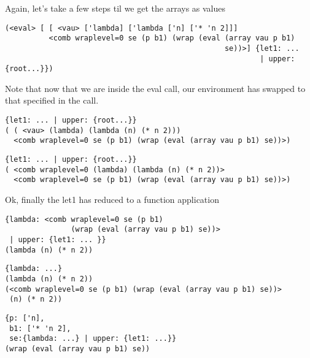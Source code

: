 \documentclass{beamer}
\begin{document}
\begin{frame}[fragile]
Again, let's take a few steps til we get the arrays as values
\footnotesize
\begin{verbatim}
(<eval> [ [ <vau> ['lambda] ['lambda ['n] ['* 'n 2]]]
          <comb wraplevel=0 se (p b1) (wrap (eval (array vau p b1)
		                                          se))>] {let1: ...
												          | upper: {root...}})
\end{verbatim}
\end{frame}

\begin{frame}[fragile]
Note that now that we are inside the eval call, our environment has swapped
to that specified in the call.
\footnotesize
\begin{verbatim}
{let1: ... | upper: {root...}}
( ( <vau> (lambda) (lambda (n) (* n 2)))
  <comb wraplevel=0 se (p b1) (wrap (eval (array vau p b1) se))>)
\end{verbatim}
\end{frame}

\begin{frame}[fragile]
\footnotesize
\begin{verbatim}
{let1: ... | upper: {root...}}
( <comb wraplevel=0 (lambda) (lambda (n) (* n 2))>
  <comb wraplevel=0 se (p b1) (wrap (eval (array vau p b1) se))>)
\end{verbatim}
Ok, finally the let1 has reduced to a function application
\end{frame}

\begin{frame}[fragile]
\footnotesize
\begin{verbatim}
{lambda: <comb wraplevel=0 se (p b1)
               (wrap (eval (array vau p b1) se))>
 | upper: {let1: ... }}
(lambda (n) (* n 2))
\end{verbatim}
\end{frame}

\begin{frame}[fragile]
\footnotesize
\begin{verbatim}
{lambda: ...}
(lambda (n) (* n 2))
(<comb wraplevel=0 se (p b1) (wrap (eval (array vau p b1) se))>
 (n) (* n 2))
\end{verbatim}
\end{frame}

\begin{frame}[fragile]
\footnotesize
\begin{verbatim}
{p: ['n],
 b1: ['* 'n 2],
 se:{lambda: ...} | upper: {let1: ...}}
(wrap (eval (array vau p b1) se))
\end{verbatim}
\end{frame}
\end{document}
